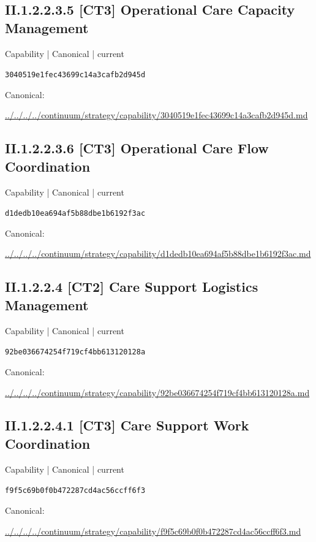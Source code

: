 \documentclass[10pt,a4paper]{article}
\begin{document}
\subsection*{II.1.2.2.3.5 [CT3] Operational Care Capacity Management}
{\small Capability | Canonical | current}\par
\texttt{3040519e1fec43699c14a3cafb2d945d}\par
Canonical: \par
{\footnotesize\url{../../../../continuum/strategy/capability/3040519e1fec43699c14a3cafb2d945d.md}}\par
\subsection*{II.1.2.2.3.6 [CT3] Operational Care Flow Coordination}
{\small Capability | Canonical | current}\par
\texttt{d1dedb10ea694af5b88dbe1b6192f3ac}\par
Canonical: \par
{\footnotesize\url{../../../../continuum/strategy/capability/d1dedb10ea694af5b88dbe1b6192f3ac.md}}\par
\subsection*{II.1.2.2.4 [CT2] Care Support Logistics Management}
{\small Capability | Canonical | current}\par
\texttt{92be036674254f719cf4bb613120128a}\par
Canonical: \par
{\footnotesize\url{../../../../continuum/strategy/capability/92be036674254f719cf4bb613120128a.md}}\par
\subsection*{II.1.2.2.4.1 [CT3] Care Support Work Coordination}
{\small Capability | Canonical | current}\par
\texttt{f9f5c69b0f0b472287cd4ac56ccff6f3}\par
Canonical: \par
{\footnotesize\url{../../../../continuum/strategy/capability/f9f5c69b0f0b472287cd4ac56ccff6f3.md}}\par
\end{document}
